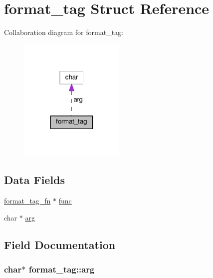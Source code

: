 \hypertarget{structformat__tag}{}\section{format\+\_\+tag Struct Reference}
\label{structformat__tag}


Collaboration diagram for format\+\_\+tag\+:
\nopagebreak
\begin{figure}[H]
\begin{center}
\leavevmode
\includegraphics[width=143pt]{structformat__tag__coll__graph}
\end{center}
\end{figure}
\subsection*{Data Fields}
\begin{DoxyCompactItemize}
\item 
\hyperlink{mod__headers_8c_ae5c29e51e20844a185ea6eb7aaef330b}{format\+\_\+tag\+\_\+fn} $\ast$ \hyperlink{structformat__tag_ad55f8a757f66c18cfce26a95b3b4f761}{func}
\item 
char $\ast$ \hyperlink{structformat__tag_a39ede6037fbb323a765c5c94b777431a}{arg}
\end{DoxyCompactItemize}


\subsection{Field Documentation}
\subsubsection[{\texorpdfstring{arg}{arg}}]{\setlength{\rightskip}{0pt plus 5cm}char$\ast$ format\+\_\+tag\+::arg}\hypertarget{structformat__tag_a39ede6037fbb323a765c5c94b777431a}{}\label{structformat__tag_a39ede6037fbb323a765c5c94b777431a}
